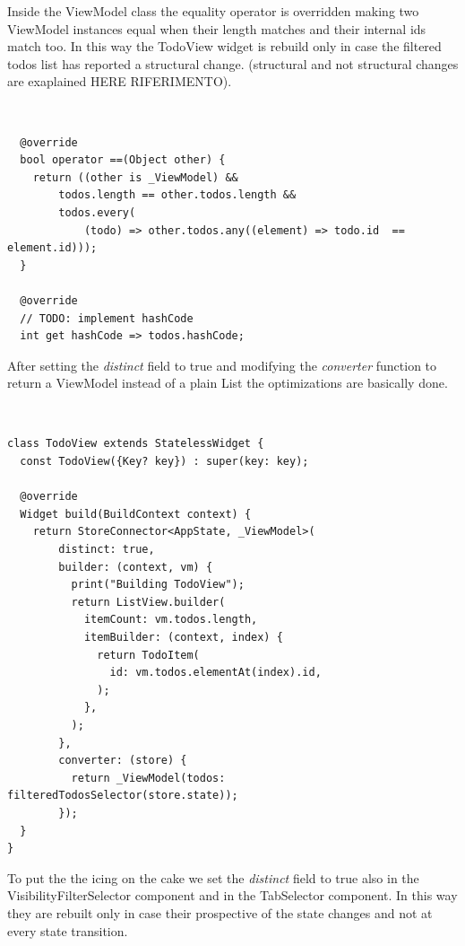  Inside the ViewModel class the equality operator is overridden making two ViewModel instances equal when their length matches and their internal ids match too. In this way the TodoView widget is rebuild only in case the filtered todos list has reported a structural change. (structural and not structural changes are exaplained HERE RIFERIMENTO). 
\begin{code}
\mbox{}\\
 \mbox{}
		\label{code:2.14}
\begin{verbatim}
  @override
  bool operator ==(Object other) {
    return ((other is _ViewModel) &&
        todos.length == other.todos.length &&
        todos.every(
            (todo) => other.todos.any((element) => todo.id  == element.id)));
  }

  @override
  // TODO: implement hashCode
  int get hashCode => todos.hashCode;
\end{verbatim}
\mbox{}
\end{code}

After setting the \textit{distinct} field to true and modifying the \textit{converter} function to return a ViewModel instead of a plain List the optimizations are basically done.
\begin{code}
\mbox{}\\
 \mbox{}
		\label{code:2.14}
\begin{verbatim}
class TodoView extends StatelessWidget {
  const TodoView({Key? key}) : super(key: key);

  @override
  Widget build(BuildContext context) {
    return StoreConnector<AppState, _ViewModel>(
        distinct: true,
        builder: (context, vm) {
          print("Building TodoView");
          return ListView.builder(
            itemCount: vm.todos.length,
            itemBuilder: (context, index) {
              return TodoItem(
                id: vm.todos.elementAt(index).id,
              );
            },
          );
        },
        converter: (store) {
          return _ViewModel(todos: filteredTodosSelector(store.state));
        });
  }
}
\end{verbatim}
\mbox{}
\end{code}

To put the  the icing on the cake we set the \textit{distinct} field to true also in the VisibilityFilterSelector component and in the TabSelector component. In this way they are rebuilt only in case their prospective of the state changes and not at every state transition.

